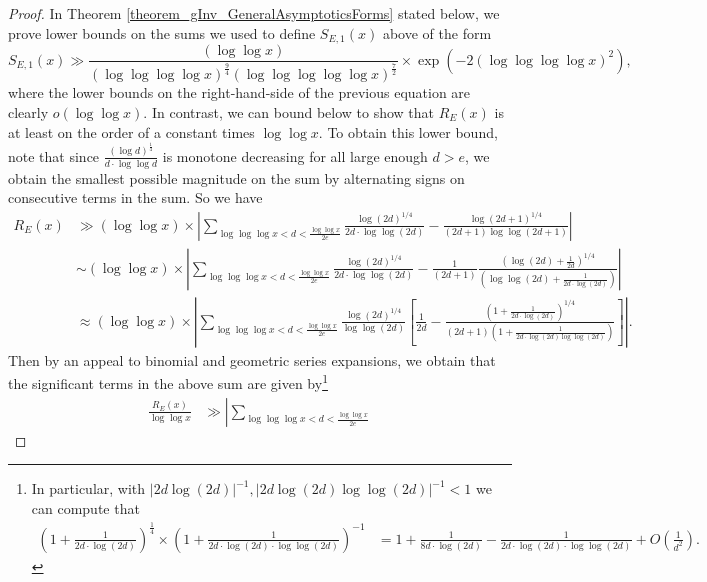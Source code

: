 \documentclass[11pt,reqno,a4letter]{article}
\numberwithin{figure}{section}
\numberwithin{table}{section}
\theoremstyle{plain}
\numberwithin{theorem}{section}
\theoremstyle{definition}
\begin{document}
\begin{proof}
In Theorem \ref{theorem_gInv_GeneralAsymptoticsForms} stated below, 
we prove lower bounds on the sums we used to 
define $S_{E,1}(x)$ above of the form 
\[
S_{E,1}(x) \gg \frac{(\log\log x)}{(\log\log\log\log x)^{\frac{9}{4}} 
     (\log\log\log\log\log x)^{\frac{7}{2}}} \times 
     \exp\left(-2 (\log\log\log\log x)^2\right), 
\]
where the lower bounds on the right-hand-side of the previous equation are clearly 
$o(\log\log x)$. 
In contrast, we can bound below to show that $R_E(x)$ is at least on the order of a constant 
times $\log\log x$. To obtain this lower bound, note that since $\frac{(\log d)^{\frac{1}{4}}}{d \cdot \log\log d}$ 
is monotone decreasing for all large enough $d > e$, we obtain the smallest possible magnitude on the sum 
by alternating signs on consecutive terms in the sum. So we have 
\begin{align*} 
R_E(x) & \gg (\log\log x) \times \left\lvert \sum_{\log\log\log x < d < \frac{\log\log x}{2e}} 
     \frac{\log(2d)^{1/4}}{2d \cdot \log\log(2d)} - \frac{\log(2d+1)^{1/4}}{(2d+1) \log\log(2d+1)} 
     \right\rvert \\ 
     & \sim (\log\log x) \times \left\lvert \sum_{\log\log\log x < d < \frac{\log\log x}{2e}} 
     \frac{\log(2d)^{1/4}}{2d \cdot \log\log(2d)} - 
     \frac{1}{(2d+1)} \frac{\left(\log(2d) + \frac{1}{2d}\right)^{1/4}}{\left( 
     \log\log(2d) + \frac{1}{2d \cdot \log(2d)}\right)} 
     \right\rvert \\ 
     & \approx (\log\log x) \times \left\lvert \sum_{\log\log\log x < d < \frac{\log\log x}{2e}} 
     \frac{\log(2d)^{1/4}}{\log\log(2d)} \left[
     \frac{1}{2d} - 
     \frac{\left(1 + \frac{1}{2d \cdot \log(2d)}\right)^{1/4}}{ 
     (2d+1) \left(1 + \frac{1}{2d \cdot \log(2d) \log\log(2d)}\right)} 
     \right] \right\rvert. 
\end{align*} 
Then by an appeal to binomial and geometric series expansions, we obtain that the significant 
terms in the above sum are given by\footnote{ 
     In particular, with $|2d \log(2d)|^{-1}, |2d \log(2d) \log\log(2d)|^{-1} < 1$ we can compute that 
     \begin{align*} 
     \left(1 + \frac{1}{2d \cdot \log(2d)}\right)^{\frac{1}{4}} \times 
          \left(1 + \frac{1}{2d \cdot \log(2d) \cdot \log\log(2d)}\right)^{-1} & = 
          1 + \frac{1}{8d \cdot \log(2d)} - \frac{1}{2d \cdot \log(2d) \cdot \log\log(2d)} + 
          O\left(\frac{1}{d^2}\right). 
     \end{align*} 
}
\begin{align*} 
\frac{R_E(x)}{\log\log x} & \gg \left\lvert \sum_{\log\log\log x < d < \frac{\log\log x}{2e}} 

\end{align*}
\end{proof}
\end{document}
